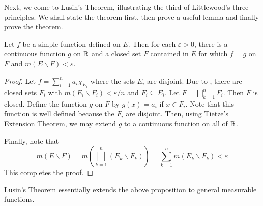 Next, we come to Lusin's Theorem, illustrating the third of Littlewood's three principles. We shall state the theorem first, then prove a useful lemma and finally prove the theorem.

\begin{lemma}
    Let $f$ be a simple function defined on $E$. Then for each $\varepsilon > 0$, there is a continuous function $g$ on $\mathbb{R}$ and a closed set $F$ contained in $E$ for which $f = g$ on $F$ and $m(E\backslash F) < \varepsilon$.
\end{lemma}
\begin{proof}
    Let $f = \sum_{i = 1}^n a_i\chi_{E_i}$ where the sets $E_i$ are disjoint. Due to , there are closed sets $F_i$ with $m(E_i\backslash F_i) < \varepsilon/n$ and $F_i\subseteq E_i$. Let $F = \bigsqcup_{k = 1}^n F_i$. Then $F$ is closed. Define the function $g$ on $F$ by $g(x) = a_i$ if $x\in F_i$. Note that this function is well defined because the $F_i$ are disjoint. Then, using Tietze's Extension Theorem, we may extend $g$ to a continuous function on all of $\mathbb{R}$.

    Finally, note that 
    \begin{equation*}
        m(E\backslash F) = m\left(\bigsqcup_{k = 1}^n(E_k\backslash F_k)\right) = \sum_{k = 1}^n m(E_k\backslash F_k) < \varepsilon
    \end{equation*}
    This completes the proof.
\end{proof}

Lusin's Theorem essentially extends the above proposition to general measurable functions.

